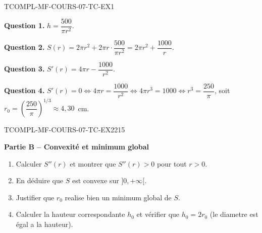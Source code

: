 \begin{corrige}{TCOMPL-MF-COURS-07-TC-EX1}

\textbf{Question 1.} $h = \dfrac{500}{\pi r^2}$.

\textbf{Question 2.} $S(r) = 2\pi r^2 + 2\pi r \cdot \dfrac{500}{\pi r^2} = 2\pi r^2 + \dfrac{1000}{r}$.


\textbf{Question 3.} $S'(r) = 4\pi r - \dfrac{1000}{r^2}$.

\textbf{Question 4.} $S'(r) = 0 \iff 4\pi r = \dfrac{1000}{r^2} \iff 4\pi r^3 = 1000 \iff r^3 = \dfrac{250}{\pi}$, soit $r_0 = \left(\dfrac{250}{\pi}\right)^{1/3} \approx 4{,}30$~cm.

\end{corrige}

\bigskip


\begin{exercice}{TCOMPL-MF-COURS-07-TC-EX2}{2}{15}

\textbf{Partie B -- Convexité et minimum global}

\begin{enumerate}
  \item Calculer $S''(r)$ et montrer que $S''(r) > 0$ pour tout $r > 0$.
  \item En déduire que $S$ est convexe sur $]0, +\infty[$.
  \item Justifier que $r_0$ realise bien un minimum global de $S$.
  \item Calculer la hauteur correspondante $h_0$ et vérifier que $h_0 = 2r_0$ (le diametre est égal a la hauteur).
\end{enumerate}

\end{exercice}

